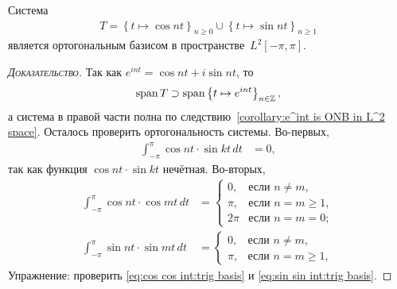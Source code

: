 \documentclass[../complex-analysis.tex]{subfiles}
\begin{document}
\begin{crly}
 \label{corollary:sin cos Orthogonal Basis}
 Система
 \begin{align}
  \label{eq:sin cos System}
  T = \left\{t \mapsto \cos nt\right\}_{n \geqslant 0} \cup \left\{t \mapsto \sin nt\right\}_{n \geqslant 1}
 \end{align} является ортогональным базисом в пространстве~$ L^{2}[-\pi,\pi] $.
\end{crly}
\begin{proof}[\normalfont\textsc{Доказательство}]
 Так как $ e^{int} = \cos nt + i \sin nt$, то
 \begin{align*}
  \mathop{\mathrm{span}}T \supset \mathop{\mathrm{span}} \left\{ t \mapsto e^{int} \right\}_{n \in \mathbb{Z}},
 \end{align*} а система в правой части полна по следствию~\ref{corollary:e^int is ONB in L^2 space}. Осталось проверить ортогональность системы. Во-первых,
 \begin{align*}
  \int_{-\pi}^{\pi} \cos nt \cdot \sin kt\,dt &= 0,
 \end{align*}  так как функция $ \cos nt \cdot \sin kt $ нечётная. Во-вторых,
 \begin{align}
  \label{eq:cos cos int:trig basis}\int_{-\pi}^{\pi} \cos nt \cdot \cos mt \,dt &= \begin{cases}
   0, &\text{если } n \neq m, \\
   \pi, &\text{если } n = m \geqslant 1,\\
   2\pi &\text{если } n = m = 0;
  \end{cases}\\
  \label{eq:sin sin int:trig basis} \int_{-\pi}^{\pi} \sin nt \cdot \sin mt\,dt &= \begin{cases}
   0, &\text{если } n \neq m,  \\
   \pi, &\text{если } n = m \geqslant 1,
  \end{cases}
 \end{align} Упражнение: проверить \eqref{eq:cos cos int:trig basis} и \eqref{eq:sin sin int:trig basis}.
\end{proof}
\end{document}
